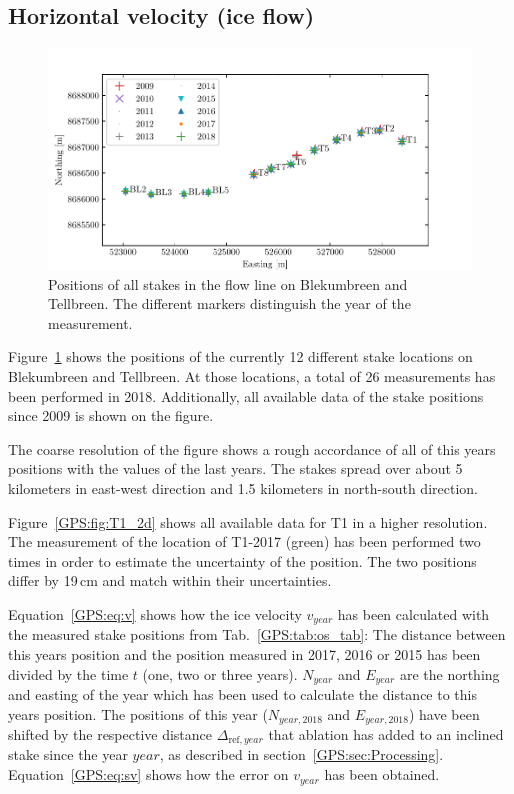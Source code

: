 \subsection{Horizontal velocity (ice flow)}

\begin{figure}[H]
    \centering
    \includegraphics[width=\textwidth]{./figs/stakePositions.pdf}
    \caption{Positions of all stakes in the flow line on Blekumbreen and Tellbreen.
    The different markers distinguish the year of the measurement.}
    \label{GPS:fig:stakepos}
\end{figure}

Figure~\ref{GPS:fig:stakepos} shows the positions of the currently 12 different stake locations
on Blekumbreen and Tellbreen.
At those locations, a total of 26 measurements has been performed in 2018.
Additionally, all available data of the stake positions since 2009 is shown on the figure.

The coarse resolution of the figure shows a rough accordance of all of this years positions with the values 
of the last years.
The stakes spread over about 5 kilometers in east-west direction and 1.5 kilometers in north-south direction.


Figure~\ref{GPS:fig:T1_2d} shows all available data for T1 in a higher resolution.
The measurement of the location of T1-2017 (green) has been performed two times in order to estimate the uncertainty
of the position.
The two positions differ by 19\,cm and match within their uncertainties.

Equation~\ref{GPS:eq:v} shows how the ice velocity $v_{year}$ has been calculated with the measured stake positions from
Tab.~\ref{GPS:tab:os_tab}:
The distance between this years position and the position measured in 2017, 2016 or 2015 has been divided by the time $t$
(one, two or three years).
$N_{year}$ and $E_{year}$ are the northing and easting of the year which has been used to calculate the distance to
this years position.
The positions of this year ($N_{year, 2018}$ and $E_{year, 2018}$) have been shifted by the respective distance
$\Delta_{\text{ref}, year}$ that ablation has
added to an inclined stake since the year $year$, as described in section~\ref{GPS:sec:Processing}.
Equation~\ref{GPS:eq:sv} shows how the error on $v_{year}$ has been obtained.

